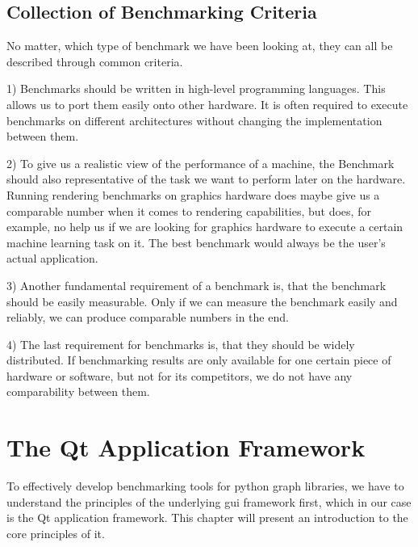 
\subsection{Collection of Benchmarking Criteria}

No matter, which type of benchmark we have been looking at, they can all be
described through common criteria.

1) Benchmarks should be written in high-level programming languages. This allows
us to port them easily onto other hardware. It is often required to execute
benchmarks on different architectures without changing the implementation
between them.

2) To give us a realistic view of the performance of a machine, the Benchmark should
also representative of the task we want to perform later on the hardware.
Running rendering benchmarks on graphics hardware does maybe give us a
comparable number when it comes to rendering capabilities, but does, for example,
no help us if we are looking for graphics hardware to execute a certain machine
learning task on it. The best benchmark would always be the user's actual
application.

3) Another fundamental requirement of a benchmark is, that the benchmark should
be easily measurable. Only if we can measure the benchmark easily and reliably,
we can produce comparable numbers in the end. 

4) The last requirement for benchmarks is, that they should be widely
distributed. If benchmarking results are only available for one certain piece of
hardware or software, but not for its competitors, we do not have any
comparability between them.



\section{The Qt Application Framework}
\label{sec:fundamentals:qt}

To effectively develop benchmarking tools for python graph libraries, we have to
understand the principles of the underlying \gls{gui} framework first, which in
our case is the Qt application framework. This chapter will present an
introduction to the core principles of it.


